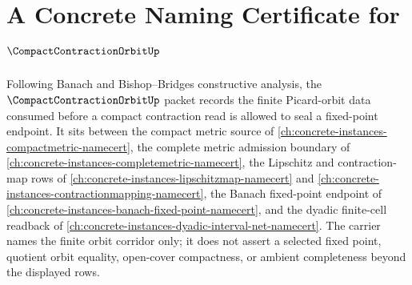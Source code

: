 \chapter{A Concrete Naming Certificate for $\CompactContractionOrbitUp$}
\label{ch:concrete-instances-compact-contraction-orbit-namecert}

Following Banach and Bishop--Bridges constructive analysis, the $\CompactContractionOrbitUp$ packet records the finite Picard-orbit data consumed before a compact contraction read is allowed to seal a fixed-point endpoint. It sits between the compact metric source of \autoref{ch:concrete-instances-compactmetric-namecert}, the complete metric admission boundary of \autoref{ch:concrete-instances-completemetric-namecert}, the Lipschitz and contraction-map rows of \autoref{ch:concrete-instances-lipschitzmap-namecert} and \autoref{ch:concrete-instances-contractionmapping-namecert}, the Banach fixed-point endpoint of \autoref{ch:concrete-instances-banach-fixed-point-namecert}, and the dyadic finite-cell readback of \autoref{ch:concrete-instances-dyadic-interval-net-namecert}. The carrier names the finite orbit corridor only; it does not assert a selected fixed point, quotient orbit equality, open-cover compactness, or ambient completeness beyond the displayed rows.

